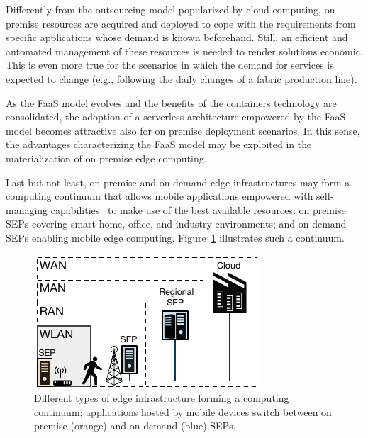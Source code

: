 Differently from the outsourcing model popularized by cloud computing, on premise resources are acquired and deployed to cope with the requirements from specific applications whose demand is known beforehand. Still, an efficient and automated management of these resources is needed to render solutions economic. This is even more true for the scenarios in which the demand for services is expected to change (e.g., following the daily changes of a fabric production line). 


As the FaaS model evolves and the benefits of the containers technology are consolidated, the adoption of a serverless architecture empowered by the FaaS model becomes attractive also for on premise deployment scenarios. In this sense, the advantages characterizing the FaaS model may be exploited in the materialization of on premise edge computing.

Last but not least, on premise and on demand edge infrastructures may form a computing continuum that allows mobile applications empowered with self-managing capabilities~\cite{Baresi:2018} to make use of the best available resources: on premise SEPs covering smart home, office, and industry environments; and on demand SEPs enabling mobile edge computing. Figure~\ref{fig:Edge_Cloud_Continuum} illustrates such a continuum.

\begin{figure}[b]
	\centering
	\includegraphics[width=1\linewidth]{Figs/Edge_Cloud_Continuum}
	\caption{Different types of edge infrastructure forming a computing continuum; applications hosted by mobile devices switch between on premise (orange) and on demand (blue) SEPs.}
	\label{fig:Edge_Cloud_Continuum}
\end{figure}


